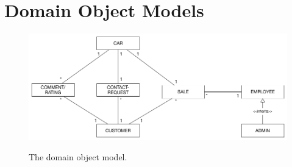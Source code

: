 \section{Domain Object Models}
\begin{figure}[h!]
	\centering
		\includegraphics[scale=0.35]{Figures/DomainObjectModel}\\
	\caption{The domain object model.}
  \label{fig:DomainObjectModel}
\end{figure}